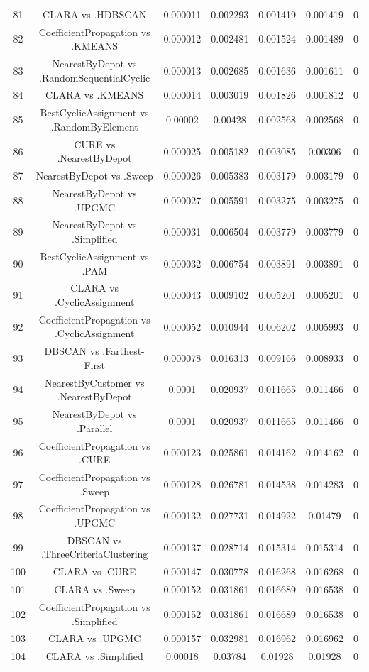 \documentclass[a4paper,10pt]{article}
\begin{document}
\begin{landscape}
\begin{table}[!htp]
\begin{tabular}{ccccccc}
81&CLARA vs .HDBSCAN&0.000011&0.002293&0.001419&0.001419&0\\
82&CoefficientPropagation vs .KMEANS&0.000012&0.002481&0.001524&0.001489&0\\
83&NearestByDepot vs .RandomSequentialCyclic&0.000013&0.002685&0.001636&0.001611&0\\
84&CLARA vs .KMEANS&0.000014&0.003019&0.001826&0.001812&0\\
85&BestCyclicAssignment vs .RandomByElement&0.00002&0.00428&0.002568&0.002568&0\\
86&CURE vs .NearestByDepot&0.000025&0.005182&0.003085&0.00306&0\\
87&NearestByDepot vs .Sweep&0.000026&0.005383&0.003179&0.003179&0\\
88&NearestByDepot vs .UPGMC&0.000027&0.005591&0.003275&0.003275&0\\
89&NearestByDepot vs .Simplified&0.000031&0.006504&0.003779&0.003779&0\\
90&BestCyclicAssignment vs .PAM&0.000032&0.006754&0.003891&0.003891&0\\
91&CLARA vs .CyclicAssignment&0.000043&0.009102&0.005201&0.005201&0\\
92&CoefficientPropagation vs .CyclicAssignment&0.000052&0.010944&0.006202&0.005993&0\\
93&DBSCAN vs .Farthest-First&0.000078&0.016313&0.009166&0.008933&0\\
94&NearestByCustomer vs .NearestByDepot&0.0001&0.020937&0.011665&0.011466&0\\
95&NearestByDepot vs .Parallel&0.0001&0.020937&0.011665&0.011466&0\\
96&CoefficientPropagation vs .CURE&0.000123&0.025861&0.014162&0.014162&0\\
97&CoefficientPropagation vs .Sweep&0.000128&0.026781&0.014538&0.014283&0\\
98&CoefficientPropagation vs .UPGMC&0.000132&0.027731&0.014922&0.01479&0\\
99&DBSCAN vs .ThreeCriteriaClustering&0.000137&0.028714&0.015314&0.015314&0\\
100&CLARA vs .CURE&0.000147&0.030778&0.016268&0.016268&0\\
101&CLARA vs .Sweep&0.000152&0.031861&0.016689&0.016538&0\\
102&CoefficientPropagation vs .Simplified&0.000152&0.031861&0.016689&0.016538&0\\
103&CLARA vs .UPGMC&0.000157&0.032981&0.016962&0.016962&0\\
104&CLARA vs .Simplified&0.00018&0.03784&0.01928&0.01928&0\\

\end{tabular}
\end{table}
\end{landscape}
\end{document}

